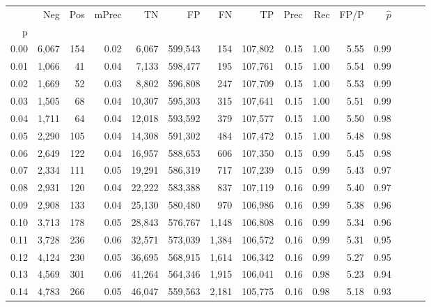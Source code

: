 \begin{tabular}{rrrrrrrrrrrrrrr}
\toprule
{} &     Neg &    Pos & mPrec &       TN &       FP &       FN &       TP &  Prec &   Rec &  FP/P & $\hat{p}$ \\
p    &         &        &       &          &          &          &          &       &       &       &           \\
\midrule
0.00 &   6,067 &    154 &  0.02 &    6,067 &  599,543 &      154 &  107,802 &  0.15 &  1.00 &  5.55 &      0.99 \\
0.01 &   1,066 &     41 &  0.04 &    7,133 &  598,477 &      195 &  107,761 &  0.15 &  1.00 &  5.54 &      0.99 \\
0.02 &   1,669 &     52 &  0.03 &    8,802 &  596,808 &      247 &  107,709 &  0.15 &  1.00 &  5.53 &      0.99 \\
0.03 &   1,505 &     68 &  0.04 &   10,307 &  595,303 &      315 &  107,641 &  0.15 &  1.00 &  5.51 &      0.99 \\
0.04 &   1,711 &     64 &  0.04 &   12,018 &  593,592 &      379 &  107,577 &  0.15 &  1.00 &  5.50 &      0.98 \\
0.05 &   2,290 &    105 &  0.04 &   14,308 &  591,302 &      484 &  107,472 &  0.15 &  1.00 &  5.48 &      0.98 \\
0.06 &   2,649 &    122 &  0.04 &   16,957 &  588,653 &      606 &  107,350 &  0.15 &  0.99 &  5.45 &      0.98 \\
0.07 &   2,334 &    111 &  0.05 &   19,291 &  586,319 &      717 &  107,239 &  0.15 &  0.99 &  5.43 &      0.97 \\
0.08 &   2,931 &    120 &  0.04 &   22,222 &  583,388 &      837 &  107,119 &  0.16 &  0.99 &  5.40 &      0.97 \\
0.09 &   2,908 &    133 &  0.04 &   25,130 &  580,480 &      970 &  106,986 &  0.16 &  0.99 &  5.38 &      0.96 \\
0.10 &   3,713 &    178 &  0.05 &   28,843 &  576,767 &    1,148 &  106,808 &  0.16 &  0.99 &  5.34 &      0.96 \\
0.11 &   3,728 &    236 &  0.06 &   32,571 &  573,039 &    1,384 &  106,572 &  0.16 &  0.99 &  5.31 &      0.95 \\
0.12 &   4,124 &    230 &  0.05 &   36,695 &  568,915 &    1,614 &  106,342 &  0.16 &  0.99 &  5.27 &      0.95 \\
0.13 &   4,569 &    301 &  0.06 &   41,264 &  564,346 &    1,915 &  106,041 &  0.16 &  0.98 &  5.23 &      0.94 \\
0.14 &   4,783 &    266 &  0.05 &   46,047 &  559,563 &    2,181 &  105,775 &  0.16 &  0.98 &  5.18 &      0.93 \\

\end{tabular}

